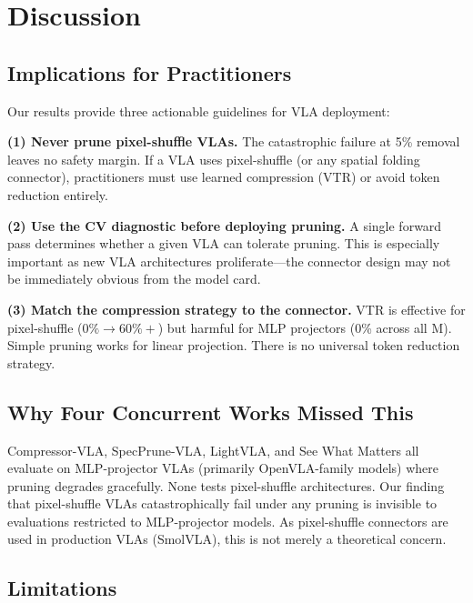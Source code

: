 \documentclass[letterpaper]{article}
\begin{document}
\section{Discussion}
\label{sec:discussion}

\subsection{Implications for Practitioners}

Our results provide three actionable guidelines for VLA deployment:

\textbf{(1) Never prune pixel-shuffle VLAs.}
The catastrophic failure at 5\% removal leaves no safety margin.
If a VLA uses pixel-shuffle (or any spatial folding connector), practitioners must use learned compression (VTR) or avoid token reduction entirely.

\textbf{(2) Use the CV diagnostic before deploying pruning.}
A single forward pass determines whether a given VLA can tolerate pruning.
This is especially important as new VLA architectures proliferate---the connector design may not be immediately obvious from the model card.

\textbf{(3) Match the compression strategy to the connector.}
VTR is effective for pixel-shuffle ($0\% \rightarrow 60\%+$) but harmful for MLP projectors (0\% across all M).
Simple pruning works for linear projection.
There is no universal token reduction strategy.

\subsection{Why Four Concurrent Works Missed This}

Compressor-VLA, SpecPrune-VLA, LightVLA, and See What Matters all evaluate on MLP-projector VLAs (primarily OpenVLA-family models) where pruning degrades gracefully.
None tests pixel-shuffle architectures.
Our finding that pixel-shuffle VLAs catastrophically fail under any pruning is invisible to evaluations restricted to MLP-projector models.
As pixel-shuffle connectors are used in production VLAs (SmolVLA), this is not merely a theoretical concern.

\subsection{Limitations}
\end{document}
